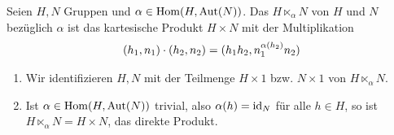 \begin{definition}
	Seien $H,N$ Gruppen und $\alpha\in\operatorname{Hom}(H,\operatorname{Aut}(N))$. Das  $H\ltimes_{\alpha}N$ von $H$ und $N$ bezüglich $\alpha$ ist das kartesische Produkt $H\times N$ mit der Multiplikation
	\begin{align}
		(h_1,n_1)\cdot (h_2,n_2) = (h_1h_2,n_1^{\alpha(h_2)}n_2)\notag
	\end{align}
\end{definition}

\begin{remark}
	\begin{enumerate}[label=(\alph*)]
		\item Wir identifizieren $H,N$ mit der Teilmenge $H\times 1$ bzw. $N\times 1$ von $H\ltimes_{\alpha} N$.
		\item Ist $\alpha\in\operatorname{Hom}(H,\operatorname{Aut}(N))$ trivial, also $\alpha(h)=\operatorname{id}_N$ für alle $h\in H$, so ist $H\ltimes_{\alpha} N=H \times N$, das direkte Produkt.
	\end{enumerate}
\end{remark}

